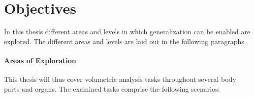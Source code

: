 












    \section{Objectives} %
        In this thesis different areas and levels in which generalization can be enabled are explored. The different areas and levels are laid out in the following paragraphs.

        \paragraph{Areas of Exploration}
            This thesis will thus cover volumetric analysis tasks throughout several body parts and organs. The examined tasks comprise the following scenarios:

